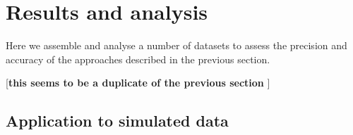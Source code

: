 \documentclass{aastex63}
\begin{document}




\section{Results and analysis}
\label{sec:results}

Here we assemble and analyse a number of datasets to assess the precision and accuracy of the approaches described in the previous section.

[{\bf this seems to be a duplicate of the previous section }]

\subsection{Application to simulated data} 
\label{sec:simulations}
\end{document}
